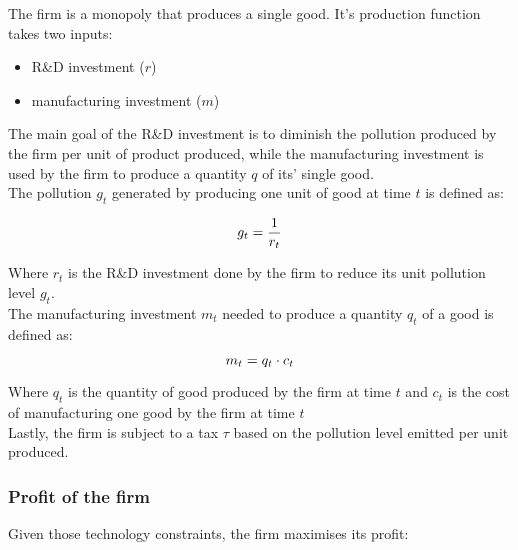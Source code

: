 \documentclass{article}
\begin{document}
The firm is a monopoly that produces a single good. It's production function takes two inputs: 

\begin{itemize}
    \item R\&D investment ($r$)
    \item manufacturing investment ($m$) 
\end{itemize}

The main goal of the R\&D investment is to diminish the pollution produced by the firm per unit of product produced, while the manufacturing investment is used by the firm to produce a quantity $q$ of its' single good. \\

The pollution $g_{t}$ generated by producing one unit of good at time $t$ is defined as:

\begin{equation}
g_{t}=\frac{1}{r_{t}} \\
\end{equation}

Where $r_{t}$ is the R\&D investment done by the firm to reduce its unit pollution level $g_{t}$. \\

The manufacturing investment $m_{t}$ needed to produce a quantity $q_{t}$ of a good is defined as: 

\begin{equation}
m_{t} = q_{t}\cdot c_{t}\\
\end{equation}

Where $q_{t}$ is the quantity of good produced by the firm at time $t$ and $c_{t}$ is the cost of manufacturing one good by the firm at time $t$\\

Lastly, the firm is subject to a tax $\tau$ based on the pollution level emitted per unit produced. \\

\subsubsection{Profit of the firm}
Given those technology constraints, the firm maximises its profit: 
\end{document}

